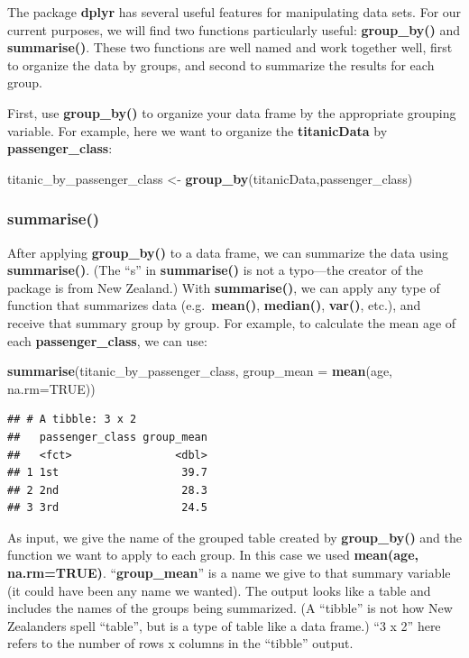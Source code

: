 \documentclass[
]{article}
\newenvironment{Shaded}{\begin{snugshade}}{\end{snugshade}}
\newcommand{\AttributeTok}[1]{\textcolor[rgb]{0.13,0.29,0.53}{#1}}
\newcommand{\ConstantTok}[1]{\textcolor[rgb]{0.56,0.35,0.01}{#1}}
\newcommand{\FunctionTok}[1]{\textcolor[rgb]{0.13,0.29,0.53}{\textbf{#1}}}
\newcommand{\NormalTok}[1]{#1}
\newcommand{\OtherTok}[1]{\textcolor[rgb]{0.56,0.35,0.01}{#1}}
\begin{document}
The package \textbf{dplyr} has several useful features for manipulating
data sets. For our current purposes, we will find two functions
particularly useful: \textbf{group\_by()} and \textbf{summarise()}.
These two functions are well named and work together well, first to
organize the data by groups, and second to summarize the results for
each group.

First, use \textbf{group\_by()} to organize your data frame by the
appropriate grouping variable. For example, here we want to organize the
\textbf{titanicData} by \textbf{passenger\_class}:

\begin{Shaded}
\begin{Highlighting}[]
\NormalTok{titanic\_by\_passenger\_class }\OtherTok{\textless{}{-}} \FunctionTok{group\_by}\NormalTok{(titanicData,passenger\_class)}
\end{Highlighting}
\end{Shaded}

\subsubsection{summarise()}\label{summarise}

After applying \textbf{group\_by()} to a data frame, we can summarize
the data using \textbf{summarise()}. (The ``s'' in \textbf{summarise()}
is not a typo---the creator of the package is from New Zealand.) With
\textbf{summarise()}, we can apply any type of function that summarizes
data (e.g.~\textbf{mean()}, \textbf{median()}, \textbf{var()}, etc.),
and receive that summary group by group. For example, to calculate the
mean age of each \textbf{passenger\_class}, we can use:

\begin{Shaded}
\begin{Highlighting}[]
\FunctionTok{summarise}\NormalTok{(titanic\_by\_passenger\_class, }\AttributeTok{group\_mean =} \FunctionTok{mean}\NormalTok{(age, }\AttributeTok{na.rm=}\ConstantTok{TRUE}\NormalTok{))}
\end{Highlighting}
\end{Shaded}

\begin{verbatim}
## # A tibble: 3 x 2
##   passenger_class group_mean
##   <fct>                <dbl>
## 1 1st                   39.7
## 2 2nd                   28.3
## 3 3rd                   24.5
\end{verbatim}

As input, we give the name of the grouped table created by
\textbf{group\_by()} and the function we want to apply to each group. In
this case we used \textbf{mean(age, na.rm=TRUE)}.
``\textbf{group\_mean}'' is a name we give to that summary variable (it
could have been any name we wanted). The output looks like a table and
includes the names of the groups being summarized. (A ``tibble'' is not
how New Zealanders spell ``table'', but is a type of table like a data
frame.) ``3 x 2'' here refers to the number of rows x columns in the
``tibble'' output.
\end{document}
